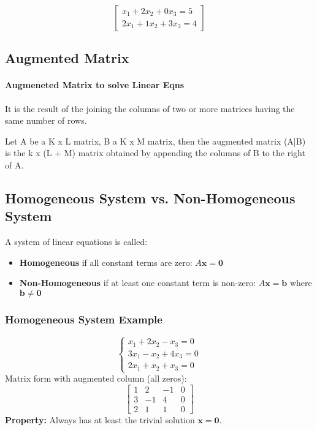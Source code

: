 \documentclass{article}
\begin{document}
$$
\begin{bmatrix}
    x_1 + 2x_2 + 0x_3 = 5 \\
    2x_1 + 1x_2 + 3x_3 = 4
\end{bmatrix}
$$
\subsection{Augmented Matrix}
\paragraph{Augmeneted Matrix to solve Linear Eqns}
It is the result of the joining the columns of two or more matrices
having the same number of rows.

Let A be a K x L matrix, B a K x M matrix, then the 
augmented matrix (A|B) is the k x (L + M) matrix obtained by appending
the columns of B to the right of A. 

\subsection{Homogeneous System vs. Non-Homogeneous System}
A system of linear equations is called:
\begin{itemize}
    \item \textbf{Homogeneous} if all constant terms are zero: 
    \( A\mathbf{x} = \mathbf{0} \)
    \item \textbf{Non-Homogeneous} if at least one constant term is non-zero: 
    \( A\mathbf{x} = \mathbf{b} \) where \( \mathbf{b} \neq \mathbf{0} \)
\end{itemize}

\subsubsection*{Homogeneous System Example}
\begin{equation*}
\begin{cases}
    x_1 + 2x_2 - x_3 = 0 \\
    3x_1 - x_2 + 4x_3 = 0 \\
    2x_1 + x_2 + x_3 = 0
\end{cases}
\end{equation*}
Matrix form with augmented column (all zeros):
\begin{equation*}
\left[\begin{array}{ccc|c}
1 & 2 & -1 & 0 \\
3 & -1 & 4 & 0 \\
2 & 1 & 1 & 0
\end{array}\right]
\end{equation*}
\textbf{Property:} Always has at least the trivial solution \( \mathbf{x} = \mathbf{0} \).
\end{document}
